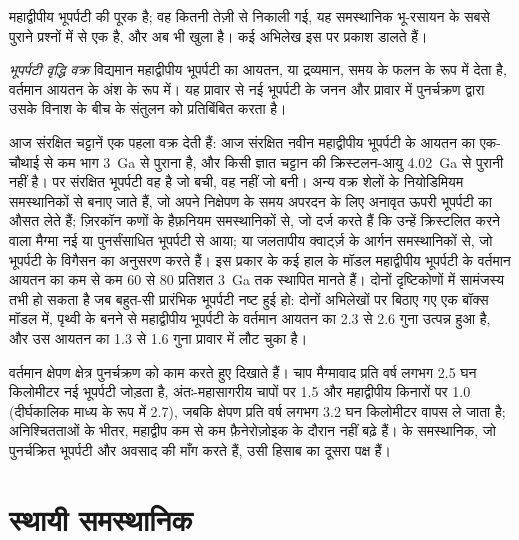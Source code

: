 महाद्वीपीय भूपर्पटी  की पूरक है; वह कितनी तेज़ी से
निकाली गई, यह समस्थानिक भू-रसायन के सबसे पुराने प्रश्नों में से एक है, और अब भी
खुला है। कई अभिलेख इस पर प्रकाश डालते हैं।

\begin{definition}[भूपर्पटी वृद्धि वक्र]\label{def:b2:isotope-geochemistry:growth}
\emph{भूपर्पटी वृद्धि वक्र} विद्यमान महाद्वीपीय भूपर्पटी का आयतन, या
द्रव्यमान, समय के फलन के रूप में देता है, वर्तमान आयतन के अंश के रूप में।
यह प्रावार से नई भूपर्पटी के जनन और प्रावार में पुनर्चक्रण द्वारा उसके
विनाश के बीच के संतुलन को प्रतिबिंबित करता है।
\end{definition}

आज संरक्षित चट्टानें एक पहला वक्र देती हैं: आज संरक्षित नवीन महाद्वीपीय भूपर्पटी के
आयतन का एक-चौथाई से कम भाग \qty{3}{Ga} से पुराना है, और
किसी ज्ञात चट्टान की क्रिस्टलन-आयु \qty{4.02}{Ga} से पुरानी नहीं है। पर
संरक्षित भूपर्पटी वह है जो बची, वह नहीं जो बनी। अन्य वक्र
शेलों के नियोडिमियम समस्थानिकों से बनाए जाते हैं, जो अपने निक्षेपण के समय
अपरदन के लिए अनावृत ऊपरी भूपर्पटी का औसत लेते हैं; ज़िरकॉन
कणों के हैफ़नियम समस्थानिकों से, जो दर्ज करते हैं कि उन्हें क्रिस्टलित करने वाला मैग्मा नई या
पुनर्संसाधित भूपर्पटी से आया; या जलतापीय क्वार्ट्ज़ के आर्गन समस्थानिकों से, जो
भूपर्पटी के विगैसन का अनुसरण करते हैं। इस प्रकार के कई हाल के मॉडल महाद्वीपीय भूपर्पटी के वर्तमान आयतन का कम से कम 60
से 80 प्रतिशत \qty{3}{Ga} तक स्थापित मानते हैं। दोनों दृष्टिकोणों में
सामंजस्य तभी हो सकता है जब बहुत-सी प्रारंभिक भूपर्पटी
नष्ट हुई हो: दोनों अभिलेखों पर बिठाए गए एक बॉक्स मॉडल में, पृथ्वी के बनने से महाद्वीपीय भूपर्पटी के
वर्तमान आयतन का 2.3 से 2.6 गुना उत्पन्न हुआ है,
और उस आयतन का 1.3 से 1.6 गुना प्रावार में लौट चुका है।

वर्तमान क्षेपण क्षेत्र पुनर्चक्रण को काम करते हुए दिखाते हैं। चाप मैग्मावाद
प्रति वर्ष लगभग 2.5 घन किलोमीटर नई भूपर्पटी जोड़ता है, अंतः-महासागरीय चापों पर 1.5 और
महाद्वीपीय किनारों पर 1.0 (दीर्घकालिक माध्य के रूप में 2.7), जबकि क्षेपण
प्रति वर्ष लगभग 3.2 घन किलोमीटर वापस ले जाता है; अनिश्चितताओं के भीतर,
महाद्वीप कम से कम फ़ैनेरोज़ोइक के दौरान नहीं बढ़े हैं।  के समस्थानिक, जो पुनर्चक्रित भूपर्पटी और अवसाद की माँग करते हैं, उसी
हिसाब का दूसरा पक्ष हैं।

\section{स्थायी समस्थानिक}


